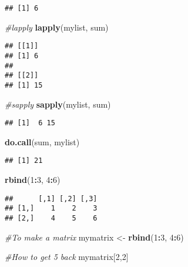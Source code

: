 \documentclass[
]{article}
\newenvironment{Shaded}{\begin{snugshade}}{\end{snugshade}}
\newcommand{\CommentTok}[1]{\textcolor[rgb]{0.56,0.35,0.01}{\textit{#1}}}
\newcommand{\DecValTok}[1]{\textcolor[rgb]{0.00,0.00,0.81}{#1}}
\newcommand{\KeywordTok}[1]{\textcolor[rgb]{0.13,0.29,0.53}{\textbf{#1}}}
\newcommand{\NormalTok}[1]{#1}
\newcommand{\OperatorTok}[1]{\textcolor[rgb]{0.81,0.36,0.00}{\textbf{#1}}}
\newcommand{\StringTok}[1]{\textcolor[rgb]{0.31,0.60,0.02}{#1}}
\begin{document}
\begin{verbatim}
## [1] 6
\end{verbatim}

\begin{Shaded}
\begin{Highlighting}[]
\CommentTok{#lapply}
\KeywordTok{lapply}\NormalTok{(mylist, sum)}
\end{Highlighting}
\end{Shaded}

\begin{verbatim}
## [[1]]
## [1] 6
## 
## [[2]]
## [1] 15
\end{verbatim}

\begin{Shaded}
\begin{Highlighting}[]
\CommentTok{#sapply}
\KeywordTok{sapply}\NormalTok{(mylist, sum)}
\end{Highlighting}
\end{Shaded}

\begin{verbatim}
## [1]  6 15
\end{verbatim}

\begin{Shaded}
\begin{Highlighting}[]
\KeywordTok{do.call}\NormalTok{(sum, mylist)}
\end{Highlighting}
\end{Shaded}

\begin{verbatim}
## [1] 21
\end{verbatim}

\begin{Shaded}
\begin{Highlighting}[]
\KeywordTok{rbind}\NormalTok{(}\DecValTok{1}\OperatorTok{:}\DecValTok{3}\NormalTok{, }\DecValTok{4}\OperatorTok{:}\DecValTok{6}\NormalTok{)}
\end{Highlighting}
\end{Shaded}

\begin{verbatim}
##      [,1] [,2] [,3]
## [1,]    1    2    3
## [2,]    4    5    6
\end{verbatim}

\begin{Shaded}
\begin{Highlighting}[]
\CommentTok{#To make a matrix}
\NormalTok{mymatrix <-}\StringTok{ }\KeywordTok{rbind}\NormalTok{(}\DecValTok{1}\OperatorTok{:}\DecValTok{3}\NormalTok{, }\DecValTok{4}\OperatorTok{:}\DecValTok{6}\NormalTok{)}

\CommentTok{#How to get 5 back}
\NormalTok{mymatrix[}\DecValTok{2}\NormalTok{,}\DecValTok{2}\NormalTok{]}
\end{Highlighting}
\end{Shaded}
\end{document}
